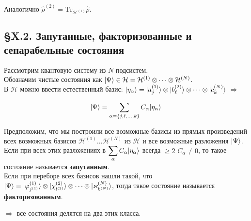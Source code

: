 Аналогично $\hat{\rho}^{(2)} = \mathrm{Tr}_{\mathcal{H}^{(1)}}\hat{\rho}$.

\subsection{\S X.2. Запутанные, факторизованные и сепарабельные состояния}

Рассмотрим квантовую систему из $N$ подсистем.\\

Обозначим чистые состояния как $| \Psi \rangle \in \mathcal{H} = \mathcal{H}^{(1)} \otimes \cdots \otimes \mathcal{H}^{(N)}$.\\

В $\mathcal{H}$ можно ввести естественный базис: $| \eta_\alpha \rangle = | a_j^{(1)} \rangle\otimes| b_\ell^{(2)} \rangle \otimes \cdots \otimes |c_k^{(N)}\rangle$ $\Rightarrow$ 

\[
| \Psi \rangle = \displaystyle\sum_{\alpha=\{j,\ell,\ldots,k\}} C_\alpha| \eta_\alpha \rangle
\]

\begin{definition}
	Предположим, что мы построили все возможные базисы из прямых произведений всех возможных базисов $\mathcal{H}^{(1)} \ldots\mathcal{H}^{(N)}$ из $\mathcal{H}$ и все возможные разложения $| \Psi \rangle$.
	Если при всех этих разложениях в $\displaystyle\sum_\alpha C_\alpha| \eta_\alpha \rangle$ всегда $\geq 2$ $C_\alpha \neq 0$, то такое состояние называется \textbf{запутанным}.\\
	
	Если при переборе всех базисов нашли такой, что $| \Psi \rangle = | \varphi_{j^{(1)}}^{(1)} \rangle \otimes | \chi_{l^{(2)}}^{(2)} \rangle \otimes \cdots \otimes | \varkappa_{k^{(N)}}^{(N)} \rangle$, тогда такое состояние называется \textbf{факторизованным}.
\end{definition}


$\Rightarrow$ все состояния делятся на два этих класса.
